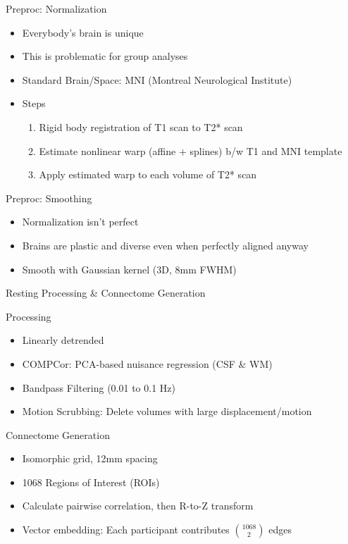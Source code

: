 \documentclass[presentation]{beamer}
\begin{document}
\begin{frame}[label={sec:orgheadline11}]{Preproc: Normalization}
\begin{itemize}
\item Everybody's brain is unique
\item This is problematic for group analyses
\item Standard Brain/Space: MNI (Montreal Neurological Institute)
\item Steps
\begin{enumerate}
\item Rigid body registration of T1 scan to T2* scan
\item Estimate nonlinear warp (affine + splines) b/w T1 and MNI template
\item Apply estimated warp to each volume of T2* scan
\end{enumerate}
\end{itemize}
\end{frame}
\begin{frame}[label={sec:orgheadline12}]{Preproc: Smoothing}
\begin{itemize}
\item Normalization isn't perfect
\item Brains are plastic and diverse even when perfectly aligned anyway
\item Smooth with Gaussian kernel (3D, 8mm FWHM)
\end{itemize}
\end{frame}
\begin{frame}[label={sec:orgheadline13}]{Resting Processing \& Connectome Generation}
\begin{block}{Processing}
\begin{itemize}
\item Linearly detrended
\item COMPCor: PCA-based nuisance regression (CSF \& WM)
\item Bandpass Filtering (0.01 to 0.1 Hz)
\item Motion Scrubbing: Delete volumes with large displacement/motion
\end{itemize}
\end{block}
\begin{block}{Connectome Generation}
\begin{itemize}
\item Isomorphic grid, 12mm spacing
\item 1068 Regions of Interest (ROIs)
\item Calculate pairwise correlation, then R-to-Z transform
\item Vector embedding: Each participant contributes \({1068}\choose{2}\) edges
\end{itemize}
\end{block}
\end{frame}
\end{document}
